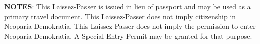\hfill%
\par





\vfill
\small
\textbf{NOTES}:
\inlinelistitem This Laissez-Passer is issued in lieu of passport and may be used as a primary travel document.
\inlinelistitem This Laissez-Passer does not imply citizenship in Neoparia Demokratia.
\inlinelistitem This Laissez-Passer does not imply the permission to enter Neoparia Demokratia. A Special Entry Permit may be granted for that purpose.



